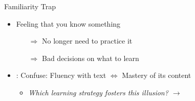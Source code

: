 \documentclass{ercisbeamer}
\begin{document}
\begin{frame}{Familiarity Trap}
    \begin{tbox}
        \begin{itemize}
            \item Feeling that you know something
            \begin{itemize}
                \item[$\Rightarrow$] No longer need to practice it
                \item[$\Rightarrow$] Bad decisions on what to learn
            \end{itemize}
            
            \item {}: Confuse: Fluency with text $\Leftrightarrow$ Mastery of its content
            \begin{itemize}
                \item \emph{Which learning strategy fosters this illusion? \pause $\rightarrow$ }
            \end{itemize}
        \end{itemize}
    \end{tbox}
\end{frame}
\end{document}
